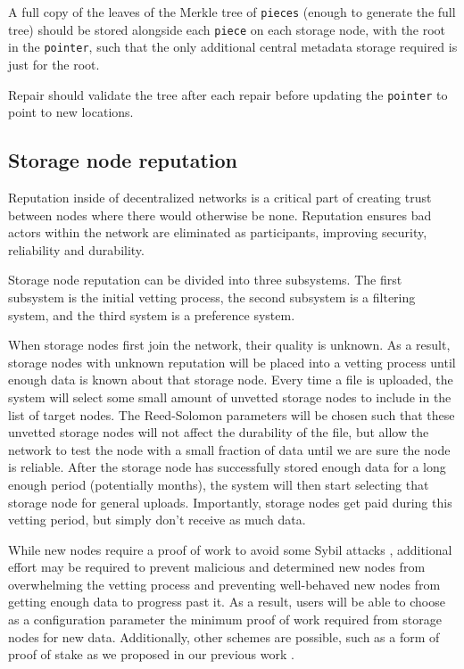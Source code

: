 \documentclass[a4paper,10pt]{article} \usepackage[utf8]{inputenc}
\newcommand{\x}[1]{{\tt #1}} \newcommand{\code}[1]{{\tt #1}}
\begin{document}
A full copy of the leaves of the Merkle tree of \x{pieces} (enough to generate
the full tree) should be stored alongside each \x{piece} on each storage node,
with the root in the \x{pointer}, such that the only additional central
metadata storage required is just for the root.

Repair should validate the tree after each repair before updating the
\x{pointer} to point to new locations.

\subsection{Storage node reputation}

Reputation inside of decentralized networks is a critical part of creating trust
between nodes where there would otherwise be none. Reputation ensures bad actors
within the network are eliminated as participants, improving security,
reliability and durability.

Storage node reputation can be divided into three subsystems. The first
subsystem is the initial vetting process, the second subsystem is a filtering
system, and the third system is a preference system.

When storage nodes first join the network, their quality is unknown.
As a result, storage nodes with unknown reputation will be placed into a vetting
process until enough data is known about that storage node.
Every time a file is uploaded, the system will select some small amount of
unvetted storage nodes to include in the list of target nodes.
The Reed-Solomon parameters will be chosen such that these unvetted storage
nodes will not affect the durability of the file, but allow the network to test
the node with a small fraction of data until we are sure the node is reliable.
After the storage node has successfully stored enough data for a long enough
period (potentially months), the system will then start selecting that storage
node for general uploads. Importantly, storage nodes get paid during this
vetting period, but simply don't receive as much data.

While new nodes require a proof of work to avoid some Sybil attacks
\cite{sybil-attack}, additional effort may be required to prevent
malicious and determined new nodes from overwhelming the vetting process and
preventing well-behaved new nodes from getting enough data to progress past it.
As a result, users will be able to choose as a configuration parameter the
minimum proof of work required from storage nodes for new data. Additionally,
other schemes are possible, such as a form of proof of stake as we proposed in
our previous work \cite{sybil-cost}.
\end{document}
